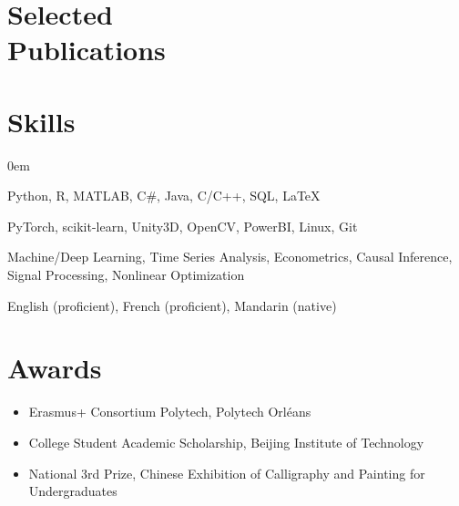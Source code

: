 \documentclass{mycv}
\begin{document}
\section{Selected \\ Publications}


\vspace{-\parskip}

\section{Skills}

\begin{description}
  \itemsep 0em
  \item[Programming:] Python, R, MATLAB, C\#, Java, C/C++, SQL, \LaTeX
  \item[Frameworks \& Tools:] PyTorch, scikit-learn, Unity3D, OpenCV, PowerBI, Linux, Git
  \item[Expertise:] Machine/Deep Learning, Time Series Analysis, Econometrics, Causal Inference, Signal Processing, Nonlinear Optimization
  \item[Languages:] English (proficient), French (proficient), Mandarin (native)
\end{description}

\vspace{-\parskip}

\section{Awards}

\begin{itemize}
  \itemsep 0em
  \item Erasmus+ Consortium Polytech, Polytech Orléans 
  \item College Student Academic Scholarship, Beijing Institute of Technology 
  \item National 3rd Prize, Chinese Exhibition of Calligraphy and Painting for Undergraduates 
\end{itemize}
\end{document}
